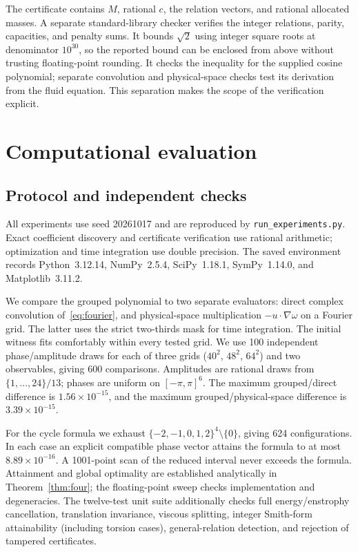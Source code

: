 \documentclass[11pt]{article}
\begin{document}
The certificate contains $M$, rational $c$, the relation vectors, and rational allocated masses. A separate standard-library checker verifies the integer relations, parity, capacities, and penalty sums. It bounds $\sqrt2$ using integer square roots at denominator $10^{30}$, so the reported bound can be enclosed from above without trusting floating-point rounding. It checks the inequality for the supplied cosine polynomial; separate convolution and physical-space checks test its derivation from the fluid equation. This separation makes the scope of the verification explicit.

\section{Computational evaluation}\label{sec:experiments}
\subsection{Protocol and independent checks}
All experiments use seed 20261017 and are reproduced by \texttt{run\_experiments.py}. Exact coefficient discovery and certificate verification use rational arithmetic; optimization and time integration use double precision. The saved environment records Python~3.12.14, NumPy~2.5.4, SciPy~1.18.1, SymPy~1.14.0, and Matplotlib~3.11.2.

We compare the grouped polynomial to two separate evaluators: direct complex convolution of~\eqref{eq:fourier}, and physical-space multiplication $-u\cdot\nabla\omega$ on a Fourier grid. The latter uses the strict two-thirds mask for time integration. The initial witness fits comfortably within every tested grid. We use 100 independent phase/amplitude draws for each of three grids ($40^2$, $48^2$, $64^2$) and two observables, giving 600 comparisons. Amplitudes are rational draws from $\{1,\ldots,24\}/13$; phases are uniform on $[-\pi,\pi]^6$. The maximum grouped/direct difference is $1.56\times10^{-15}$, and the maximum grouped/physical-space difference is $3.39\times10^{-15}$.

For the cycle formula we exhaust $\{-2,-1,0,1,2\}^4\setminus\{0\}$, giving 624 configurations. In each case an explicit compatible phase vector attains the formula to at most $8.89\times10^{-16}$. A 1001-point scan of the reduced interval never exceeds the formula. Attainment and global optimality are established analytically in Theorem~\ref{thm:four}; the floating-point sweep checks implementation and degeneracies. The twelve-test unit suite additionally checks full energy/enstrophy cancellation, translation invariance, viscous splitting, integer Smith-form attainability (including torsion cases), general-relation detection, and rejection of tampered certificates.
\end{document}
